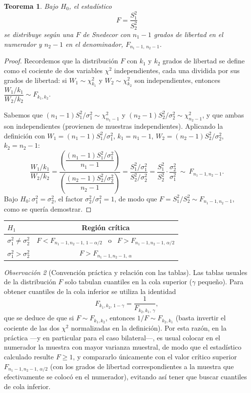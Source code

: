 \documentclass[11pt,a4paper]{article}
\theoremstyle{plain}
\newtheorem{teorema}{Teorema}[section]
\theoremstyle{definition}
\theoremstyle{remark}
\newtheorem{observacion}[teorema]{Observación}
\begin{document}
\begin{teorema}
Bajo $H_0$, el estadístico
\[
F=\frac{S_1^2}{S_2^2}
\]
se distribuye según una $F$ de Snedecor con $n_1-1$ grados de libertad en el numerador y $n_2-1$ en el denominador, $F_{n_1-1,\,n_2-1}$.
\end{teorema}

\begin{proof}
Recordemos que la distribución $F$ con $k_1$ y $k_2$ grados de libertad se define como el cociente de dos variables $\chi^2$ independientes, cada una dividida por sus grados de libertad: si $W_1\sim\chi^2_{k_1}$ y $W_2\sim\chi^2_{k_2}$ son independientes, entonces $\dfrac{W_1/k_1}{W_2/k_2}\sim F_{k_1,k_2}$.

Sabemos que $(n_1-1)S_1^2/\sigma_1^2\sim\chi^2_{n_1-1}$ y $(n_2-1)S_2^2/\sigma_2^2\sim\chi^2_{n_2-1}$, y que ambas son independientes (provienen de muestras independientes). Aplicando la definición con $W_1=(n_1-1)S_1^2/\sigma_1^2$, $k_1=n_1-1$, $W_2=(n_2-1)S_2^2/\sigma_2^2$, $k_2=n_2-1$:
\[
\frac{W_1/k_1}{W_2/k_2} = \frac{\left(\dfrac{(n_1-1)S_1^2/\sigma_1^2}{n_1-1}\right)}{\left(\dfrac{(n_2-1)S_2^2/\sigma_2^2}{n_2-1}\right)}=\frac{S_1^2/\sigma_1^2}{S_2^2/\sigma_2^2}=\frac{S_1^2}{S_2^2}\cdot\frac{\sigma_2^2}{\sigma_1^2}\ \sim\ F_{n_1-1,n_2-1}.
\]
Bajo $H_0:\sigma_1^2=\sigma_2^2$, el factor $\sigma_2^2/\sigma_1^2=1$, de modo que $F=S_1^2/S_2^2\sim F_{n_1-1,n_2-1}$, como se quería demostrar.
\end{proof}

\begin{table}[h]
\centering
\small
\begin{tabular}{@{}lc@{}}
\toprule
$H_1$ & Región crítica \\
\midrule
$\sigma_1^2\neq\sigma_2^2$ & $F<F_{n_1-1,n_2-1,\,1-\alpha/2}$ \ o \ $F>F_{n_1-1,n_2-1,\,\alpha/2}$ \\
$\sigma_1^2>\sigma_2^2$ & $F>F_{n_1-1,n_2-1,\,\alpha}$ \\
\bottomrule
\end{tabular}
\end{table}

\begin{observacion}[Convención práctica y relación con las tablas]
Las tablas usuales de la distribución $F$ solo tabulan cuantiles en la cola superior ($\gamma$ pequeño). Para obtener cuantiles de la cola inferior se utiliza la identidad
\[
F_{k_1,k_2,\,1-\gamma}=\frac{1}{F_{k_2,k_1,\,\gamma}},
\]
que se deduce de que si $F\sim F_{k_1,k_2}$, entonces $1/F\sim F_{k_2,k_1}$ (basta invertir el cociente de las dos $\chi^2$ normalizadas en la definición). Por esta razón, en la práctica —y en particular para el caso bilateral—, es usual colocar en el numerador la muestra con mayor varianza muestral, de modo que el estadístico calculado resulte $F\ge1$, y compararlo únicamente con el valor crítico superior $F_{n_1-1,n_2-1,\,\alpha/2}$ (con los grados de libertad correspondientes a la muestra que efectivamente se colocó en el numerador), evitando así tener que buscar cuantiles de cola inferior.
\end{observacion}
\end{document}
